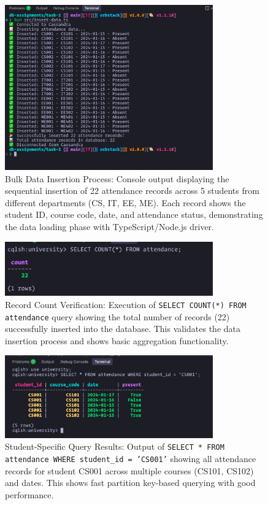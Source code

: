 \begin{figure}[H]
  \centering
  \includegraphics[width=0.8\textwidth]{task-2/screenshots/insert-data.png}
  \caption{Bulk Data Insertion Process: Console output displaying the sequential insertion of 22 attendance records across 5 students from different departments (CS, IT, EE, ME). Each record shows the student ID, course code, date, and attendance status, demonstrating the data loading phase with TypeScript/Node.js driver.}
  \label{fig:task2-insert-data}
\end{figure}

\begin{figure}[H]
  \centering
  \includegraphics[width=0.8\textwidth]{task-2/screenshots/count_query.png}
  \caption{Record Count Verification: Execution of \texttt{SELECT COUNT(*) FROM attendance} query showing the total number of records (22) successfully inserted into the database. This validates the data insertion process and shows basic aggregation functionality.}
  \label{fig:task2-count-query}
\end{figure}

\begin{figure}[H]
  \centering
  \includegraphics[width=0.8\textwidth]{task-2/screenshots/select-where_student_id.png}
  \caption{Student-Specific Query Results: Output of \texttt{SELECT * FROM attendance WHERE student\_id = 'CS001'} showing all attendance records for student CS001 across multiple courses (CS101, CS102) and dates. This shows fast partition key-based querying with good performance.}
  \label{fig:task2-select-student}
\end{figure}

